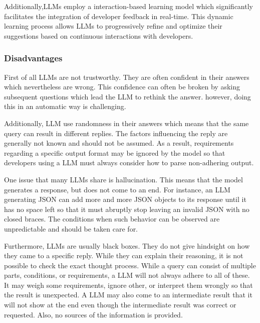Additionally,\acp{LLM} employ a interaction-based learning model which significantly facilitates the integration of developer feedback in real-time. This dynamic learning process allows \acp{LLM} to progressively refine and optimize their suggestions based on continuous interactions with developers. \cite{10.1145/3581641.3584037} 


\subsubsection{Disadvantages}

First of all \ac{LLM}s are not trustworthy. They are often confident in their answers which nevertheless are wrong. This confidence can often be broken by asking subsequent questions which lead the \ac{LLM} to rethink the answer. however, doing this in an automatic way is challenging. \cite{azaria2023internal}

Additionally, \ac{LLM} use randomness in their answers which means that the same query can result in different replies. The factors influencing the reply are generally not known and should not be assumed. As a result, requirements regarding a specific output format may be ignored by the model so that developers using a \ac{LLM} must always consider how to parse non-adhering output.  \cite{hu2023large}

One issue that many \acp{LLM} share is hallucination. This means that the model generates a response, but does not come to an end. For instance, an \ac{LLM} generating \ac{JSON} can add more and more \ac{JSON} objects to its response until it has no space left so that it must abruptly stop leaving an invalid \ac{JSON} with no closed braces.  The conditions when such behavior can be observed are unpredictable and should be taken care for. 

Furthermore, \ac{LLM}s are usually black boxes. They do not give hindsight on how they came to a specific reply. While they can explain their reasoning, it is not possible to check the exact thought process.
While a query can consist of multiple parts, conditions, or requirements, a \ac{LLM} will not always adhere to all of these. It may weigh some requirements, ignore other, or interpret them wrongly so that the result is unexpected. A \ac{LLM} may also come to an intermediate result that it will not show at the end even though the intermediate result was correct or requested. Also, no sources of the information is provided. \cite{chen2023instructzero}

